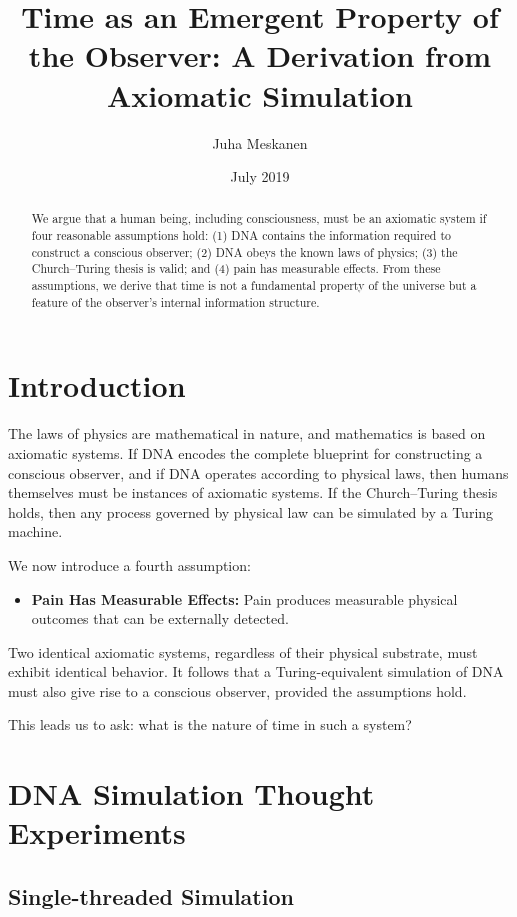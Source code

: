 \documentclass[11pt]{article}
\title{Time as an Emergent Property of the Observer: A Derivation from Axiomatic Simulation}
\author{Juha Meskanen}
\date{July 2019}
\begin{document}
\maketitle

\begin{abstract}
  We argue that a human being, including consciousness, must be an axiomatic system if four reasonable
  assumptions hold: (1) DNA contains the information required to construct a conscious observer;
  (2) DNA obeys the known laws of physics; (3) the Church--Turing thesis is valid; and (4) pain has measurable effects.
  From these assumptions, we derive that time is not a fundamental property of the universe but a feature of the
  observer's internal information structure.
\end{abstract}

\section{Introduction}

The laws of physics are mathematical in nature, and mathematics is based on axiomatic systems.
If DNA encodes the complete blueprint for constructing a conscious observer, and if DNA operates according to physical laws,
then humans themselves must be instances of axiomatic systems.
If the Church--Turing thesis holds, then any process governed by physical law can be simulated by a Turing machine.

We now introduce a fourth assumption:

\begin{itemize}
  \item \textbf{Pain Has Measurable Effects:} Pain produces measurable physical outcomes that can be externally detected.
\end{itemize}

Two identical axiomatic systems, regardless of their physical substrate, must exhibit identical behavior. It follows that a Turing-equivalent simulation of DNA must also give rise to a conscious observer, provided the assumptions hold.

This leads us to ask: what is the nature of time in such a system?

\section{DNA Simulation Thought Experiments}

\subsection{Single-threaded Simulation}
\end{document}
